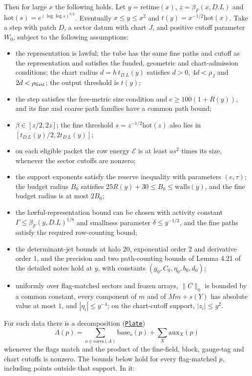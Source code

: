 \documentclass[
  letterpaper,
  11pt]{article}
\providecommand{\tightlist}{%
  \setlength{\itemsep}{0pt}\setlength{\parskip}{0pt}}
\begin{document}
Then for large \(x\) the following holds. Let \(y=\mathrm{retime}(x)\),
\(z=\beta_F(x,D.L)\) and \(\mathrm{hot}(s)=e^{(\log\log s)^{3/2}}\).
Eventually \(x\le y\le x^2\) and \(t(y)=x^{-1/2}\mathrm{hot}(x)\). Take
a step with patch \(D\), a sector datum with chart \(J\), and positive
cutoff parameter \(W_0\), subject to the following assumptions:

\begin{itemize}
\tightlist
\item
  the representation is lawful; the tube has the same fine paths and
  cutoff as the representation and satisfies the funded, geometric and
  chart-admission conditions; the chart radius \(d=h\,t_{D.L}(y)\)
  satisfies \(d>0\), \(4d<\rho_J\) and \(2d<\rho_{\rm first}\); the
  output threshold is \(t(y)\);
\item
  the step satisfies the free-metric size condition and
  \(c\ge100(1+R(y))\), and its fine and coarse path families have a
  common path bound;
\item
  \(\beta\in[z/2,2z]\); the fine threshold \(s=z^{-1/2}\mathrm{hot}(z)\)
  also lies in \([t_{D.L}(y)/2,2t_{D.L}(y)]\);
\item
  on each eligible packet the row energy \(\mathcal E\) is at least
  \(a s^2\) times its size, whenever the sector cutoffs are nonzero;
\item
  the support exponents satisfy the reserve inequality with parameters
  \((e,\tau)\); the budget radius \(B_0\) satisfies
  \(25R(y)+30\le B_0\le\mathrm{walls}(y)\), and the fine budget radius
  is at most \(2B_0\);
\item
  the lawful-representation bound can be chosen with activity constant
  \(\Gamma\le\beta_F(y,D.L)^{1/8}\) and smallness parameter
  \(\delta\le y^{-1/2}\), and the fine paths satisfy the required
  row-counting bound;
\item
  the determinant-jet bounds at halo \(20\), exponential order \(2\) and
  derivative order \(1\), and the precision and two path-counting bounds
  of Lemma 4.21 of the detailed notes hold at \(y\), with constants
  \((g_0,C_0,\eta_0,b_0,d_0)\);
\item
  uniformly over flag-matched sectors and frozen arrays, \(\|C\|_0\) is
  bounded by a common constant, every component of \(m\) and of
  \(Mm+s(Y)\) has absolute value at most \(1\), and
  \(|\eta_i|\le y^{-4}\); on the chart-cutoff support, \(|z_i|\le y^2\).
\end{itemize}

For such data there is a decomposition
(\href{https://github.com/yang-mills-group/OpenAI-YM-20261028/blob/3456e5e75cf8d4cd558955a5c7638fba2d68f464/YM/PhysicalNext/AFTERNOON_INTERACTING_RANK_COMPARISON/Opacity/Plotter.lean\#L19-L28}{\texttt{Plate}})
\[\Lambda(p)=\sum_{o\in\mathrm{cores}(A)}\mathrm{base}_o(p)+\sum_X\mathrm{aux}_X(p)\]
whenever the flags match and the product of the fine-field, block,
gauge-tag and chart cutoffs is nonzero. The bounds below hold for every
flag-matched \(p\), including points outside that support. In it:
\end{document}
